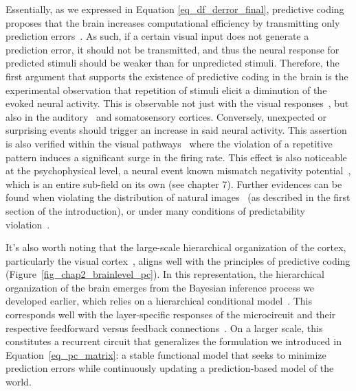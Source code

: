 Essentially, as we expressed in Equation \ref{eq_df_derror_final}, predictive coding proposes that the brain increases computational efficiency by transmitting only prediction errors~\cite{friston2005theory}. As such, if a certain visual input does not generate a prediction error, it should not be transmitted, and thus the neural response for predicted stimuli should be weaker than for unpredicted stimuli. Therefore, the first argument that supports the existence of predictive coding in the brain is the experimental observation that repetition of stimuli elicit a diminution of the evoked neural activity. This is observable not just with the visual responses~\cite{summerfield2008neural, summerfield2011human}, but also in the auditory~\cite{garrido2007evoked, todorovic2011prior} and somatosensory cortices. 
Conversely, unexpected or surprising events should trigger an increase in said neural activity. This assertion is also verified within the visual pathways~\cite{pak2021impaired} where the violation of a repetitive pattern induces a significant surge in the firing rate. This effect is also noticeable at the psychophysical level, a neural event known mismatch negativity potential~\cite{alho1995cerebral, wacongne2012neuronal}, which is an entire sub-field on its own (see chapter 7). Further evidences can be found when violating the distribution of natural images~\cite{bair2003time,fiser2004small} (as described in the first section of the introduction), or under many conditions of predictability violation~\cite{kok2012attention, meyer2011statistical,murray2002shape}.

It's also worth noting that the large-scale hierarchical organization of the cortex, particularly the visual cortex~\cite{felleman1991distributed}, aligns well with the principles of predictive coding (Figure~\ref{fig_chap2_brainlevel_pc}). In this representation, the hierarchical organization of the brain emerges from the Bayesian inference process we developed earlier, which relies on a hierarchical conditional model~\cite{friston2006free}. This corresponds well with the layer-specific responses of the microcircuit and their respective feedforward versus feedback connections~\cite{markov2014anatomy}. On a larger scale, this constitutes a recurrent circuit that generalizes the formulation we introduced in Equation~\ref{eq_pc_matrix}: a stable functional model that seeks to minimize prediction errors while continuously updating a prediction-based model of the world.

